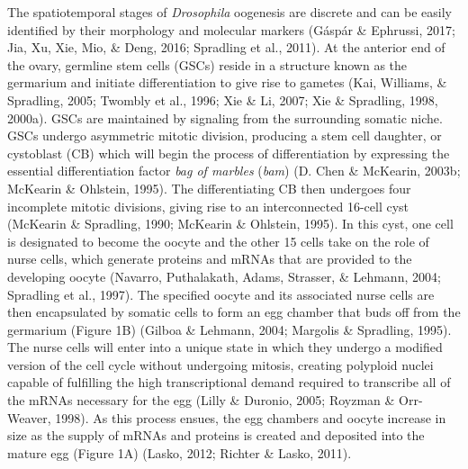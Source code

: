 \documentclass[12pt,twoside]{reedthesis}
\begin{document}
The spatiotemporal stages of \emph{Drosophila} oogenesis are discrete and can
be easily identified by their morphology and molecular markers
(Gáspár \& Ephrussi, 2017; Jia, Xu, Xie, Mio, \& Deng, 2016; Spradling et al., 2011). At the anterior end of
the ovary, germline stem cells (GSCs) reside in a structure known as the
germarium and initiate differentiation to give rise to gametes
(Kai, Williams, \& Spradling, 2005; Twombly et al., 1996; Xie \& Li, 2007; Xie \& Spradling, 1998, 2000a). GSCs
are maintained by signaling from the surrounding somatic niche. GSCs
undergo asymmetric mitotic division, producing a stem cell daughter, or
cystoblast (CB) which will begin the process of differentiation by
expressing the essential differentiation factor \emph{bag of marbles} (\emph{bam})
(D. Chen \& McKearin, 2003b; McKearin \& Ohlstein, 1995). The differentiating CB then undergoes
four incomplete mitotic divisions, giving rise to an interconnected
16-cell cyst (McKearin \& Spradling, 1990; McKearin \& Ohlstein, 1995). In this cyst, one
cell is designated to become the oocyte and the other 15 cells take on
the role of nurse cells, which generate proteins and mRNAs that are
provided to the developing oocyte (Navarro, Puthalakath, Adams, Strasser, \& Lehmann, 2004; Spradling et al., 1997).
The specified oocyte and its associated nurse cells are then
encapsulated by somatic cells to form an egg chamber that buds off from
the germarium (Figure 1B) (Gilboa \& Lehmann, 2004; Margolis \& Spradling, 1995). The nurse
cells will enter into a unique state in which they undergo a modified
version of the cell cycle without undergoing mitosis, creating polyploid
nuclei capable of fulfilling the high transcriptional demand required to
transcribe all of the mRNAs necessary for the egg (Lilly \& Duronio, 2005; Royzman \& Orr-Weaver, 1998). As this process ensues, the egg chambers and oocyte
increase in size as the supply of mRNAs and proteins is created and
deposited into the mature egg (Figure 1A) (Lasko, 2012; Richter \& Lasko, 2011).
\end{document}
